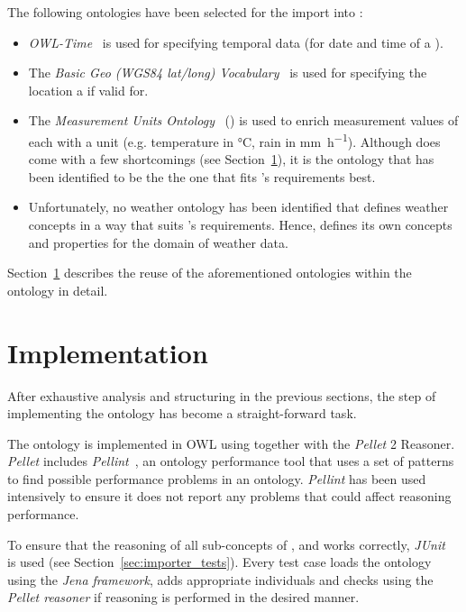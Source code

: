 The following ontologies have been selected for the import into \smarthomeweather:
\begin{itemize}
  \item \emph{OWL-Time}~\cite{owl-time} is used for specifying temporal data (for date and time of a ).
  \item The \emph{Basic Geo (WGS84 lat/long) Vocabulary}~\cite{wgs84_vocabulary} is used for specifying the location a  if valid for.
  \item The \emph{Measurement Units Ontology}~\cite{MUO} (\muo) is used to enrich measurement values of each  with a unit (e.g. temperature in \si{\celsius}, rain in \si{\milli\metre\per\hour}). Although \muo does come with a few shortcomings (see Section~\ref{sec:implementation}), it is the ontology that has been identified to be the the one that fits \smarthomeweather's requirements best.
  \item Unfortunately, no weather ontology has been identified that defines weather concepts in a way that suits \smarthomeweather's requirements. Hence, \smarthomeweather defines its own concepts and properties for the domain of weather data.
\end{itemize}

Section~\ref{sec:implementation} describes the reuse of the aforementioned ontologies within the \smarthomeweather ontology in detail.

\section{Implementation}
\label{sec:implementation}


After exhaustive analysis and structuring in the previous sections, the step of implementing the ontology has become a straight-forward task.

The \smarthomeweather ontology is implemented in OWL using  together with the \emph{Pellet}  2 Reasoner. \emph{Pellet} includes \emph{Pellint}~\cite{pellint}, an ontology performance tool that uses a set of patterns to find possible performance problems in an  ontology. \emph{Pellint} has been used intensively to ensure it does not report any problems that could affect reasoning performance.

To ensure that the reasoning of all sub-concepts of ,  and  works correctly, \emph{JUnit}~\cite{junit} is used (see Section~\ref{sec:importer_tests}). Every test case loads the \smarthomeweather ontology using the \emph{Jena framework}, adds appropriate individuals and checks using the \emph{Pellet reasoner} if reasoning is performed in the desired manner.

